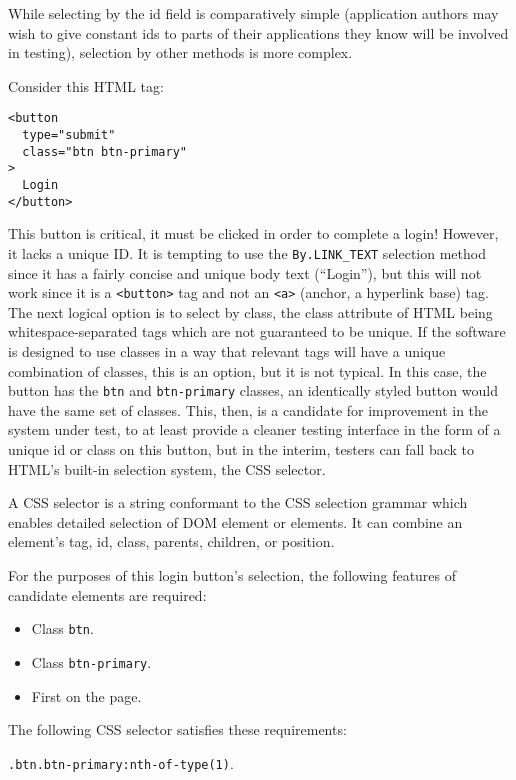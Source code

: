 While selecting by the id field is comparatively simple (application authors may wish to give constant ids to parts of their applications they know will be involved in testing)\citep{DOMStand78}, selection by other methods is more complex.

Consider this HTML tag:

\begin{Verbatim}[fontsize=\small, baselinestretch=0.75]
<button
  type="submit"
  class="btn btn-primary"
>
  Login
</button>
\end{Verbatim}

This button is critical, it must be clicked in order to complete a login! However, it lacks a unique ID. It is tempting to use the \texttt{By.LINK\_TEXT} selection method since it has a fairly concise and unique body text (``Login''), but this will not work since it is a \texttt{<button>} tag and not an \texttt{<a>} (anchor, a hyperlink base) tag. The next logical option is to select by class, the class attribute of HTML being whitespace-separated tags which are not guaranteed to be unique. If the software is designed to use classes in a way that relevant tags will have a unique combination of classes, this is an option, but it is not typical. In this case, the button has the \texttt{btn} and \texttt{btn-primary} classes, an identically styled button would have the same set of classes. This, then, is a candidate for improvement in the system under test, to at least provide a cleaner testing interface in the form of a unique id or class on this button, but in the interim, testers can fall back to HTML's built-in selection system, the CSS selector.

A CSS selector is a string conformant to the CSS selection grammar \citep{Selector54} which enables detailed selection of DOM element or elements. It can combine an element's tag, id, class, parents, children, or position.

For the purposes of this login button's selection, the following features of candidate elements are required:
\begin{itemize}
\item Class \texttt{btn}.
\item Class \texttt{btn-primary}.
\item First on the page.
\end{itemize}

The following CSS selector satisfies these requirements:

\texttt{.btn.btn-primary:nth-of-type(1)}.

